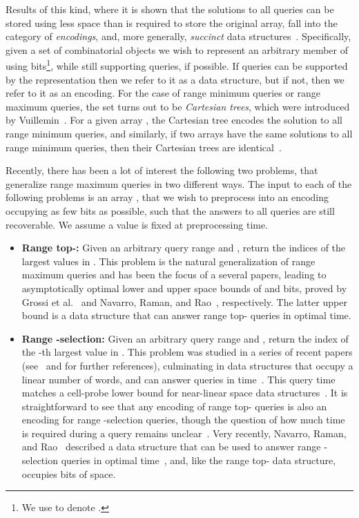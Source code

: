 \documentclass[runningheads]{llncs}
\begin{document}
Results of this kind, where it is shown that the solutions to all
queries can be stored using less space than is required to store the
original array, fall into the category of \emph{encodings}, and, more
generally, \emph{succinct} data structures~\cite{J89}.  Specifically,
given a set of combinatorial objects  we wish to represent an
arbitrary member of  using 
bits\footnote{We use  to denote .}, while still
supporting queries, if possible.  If queries can be supported by the
representation then we refer to it as a data structure, but if not,
then we refer to it as an encoding.  For the case of range minimum
queries or range maximum queries, the set  turns out to be
\emph{Cartesian trees}, which were introduced by Vuillemin~\cite{V80}.
For a given array , the Cartesian tree encodes the solution to all
range minimum queries, and similarly, if two arrays have the same
solutions to all range minimum queries, then their Cartesian trees are
identical~\cite{FH11}.

Recently, there has been a lot of interest the following two problems,
that generalize range maximum queries in two different ways.  The
input to each of the following problems is an array , that we
wish to preprocess into an encoding occupying as few bits as possible,
such that the answers to all queries are still recoverable.  We assume
a value  is fixed at preprocessing time.
\begin{itemize}

\item \textbf{Range top-:} Given an arbitrary query range  and , return the indices of the 
  largest values in .  This problem is the natural
  generalization of range maximum queries and has been the focus of a
  several papers, leading to asymptotically optimal lower and upper
  space bounds of  and  bits, proved by
  Grossi et al.~\cite{GINRS13} and Navarro, Raman, and
  Rao~\cite{NRS14}, respectively.  The latter upper bound is a data
  structure that can answer range top- queries in optimal
   time.

\item \textbf{Range -selection:} Given an arbitrary query range
   and , return the index of the
  -th largest value in .  This problem was studied in a
  series of recent papers (see~\cite{GPT09} and \cite{BGJS10} for
  further references), culminating in data structures that occupy a
  linear number of words, and can answer queries in  time~\cite{CW13}.  This query time matches a cell-probe
  lower bound for near-linear space data structures~\cite{JL11}. It is
  straightforward to see that any encoding of range top- queries is
  also an encoding for range -selection queries, though the
  question of how much time is required during a query remains
  unclear~\cite{NRS14}.  Very recently, Navarro, Raman, and
  Rao~\cite{NRS14} described a data structure that can be used to
  answer range -selection queries in optimal  time~\cite{NRS14}, and, like the range top- data structure,
  occupies  bits of space.
\end{itemize}
\end{document}
